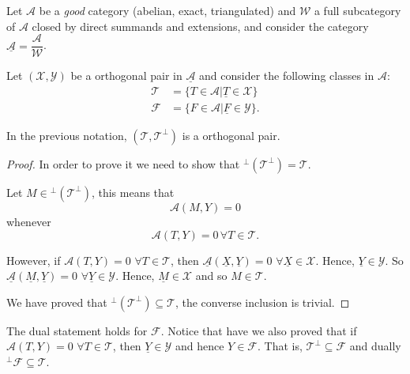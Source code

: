 Let $\mathcal{A}$ be a \emph{good} category (abelian, exact, triangulated) and $\mathcal{W}$ a full subcategory of $\mathcal{A}$ closed by direct summands and extensions, and consider the category $\underline{\mathcal{A}}=\dfrac{\mathcal{A}}{\mathcal{W}}$.

Let $(\mathcal{X},\mathcal{Y})$ be a orthogonal pair in $\underline{\mathcal{A}}$ and consider the following classes in $\mathcal{A}$:
\begin{align*}
  \mathcal{T} &= \{ T\in\mathcal{A} | \underline{T}\in\mathcal{X} \} \\
  \mathcal{F} &= \{ F\in\mathcal{A} | \underline{F}\in\mathcal{Y} \}.
\end{align*}

\begin{lemma}
  In the previous notation, $(\mathcal{T}, \mathcal{T}^\perp)$ is a orthogonal pair.
\end{lemma}

\begin{proof}
  In order to prove it we need to show that $^\perp(\mathcal{T}^\perp) = \mathcal{T}$.

  Let $M\in {^\perp(\mathcal{T}^\perp)}$, this means that
  \begin{equation}
    \mathcal{A}(M,Y) = 0
  \end{equation}
  whenever
  \begin{equation}
    \mathcal{A}(T,Y) = 0\,\forall T\in\mathcal{T}.
  \end{equation}

  However, if $\mathcal{A}(T,Y)=0$ $\forall T\in\mathcal{T}$, then $\underline{\mathcal{A}}(\underline{X},\underline{Y})=0$ $\forall \underline{X}\in\mathcal{X}$. Hence, $\underline{Y}\in\mathcal{Y}$.
  So $\underline{\mathcal{A}}(\underline{M},\underline{Y})=0$ $\forall \underline{Y}\in\mathcal{Y}$. Hence, $\underline{M}\in\mathcal{X}$ and so $M\in\mathcal{T}$.

  We have proved that $^\perp(\mathcal{T}^\perp) \subseteq \mathcal{T}$, the converse inclusion is trivial.
\end{proof}

\begin{rmk}
  The dual statement holds for $\mathcal{F}$. Notice that have we also proved that if $\mathcal{A}(T,Y)=0$ $\forall T\in\mathcal{T}$, then $\underline{Y}\in\mathcal{Y}$ and hence $Y\in\mathcal{F}$. That is, $\mathcal{T}^\perp \subseteq \mathcal{F}$ and dually $^\perp\mathcal{F}\subseteq \mathcal{T}$.
\end{rmk}

